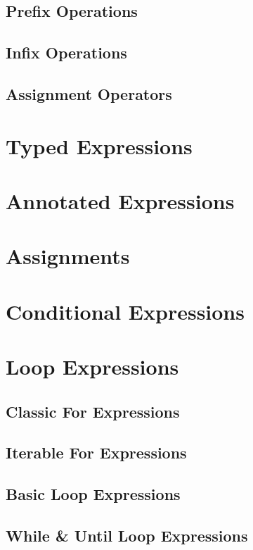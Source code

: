\subsection{Prefix Operations}

\subsection{Infix Operations}

\subsection{Assignment Operators}

\section{Typed Expressions}

\section{Annotated Expressions}

\section{Assignments}

\section{Conditional Expressions}

\section{Loop Expressions}

\subsection{Classic For Expressions}

\subsection{Iterable For Expressions}

\subsection{Basic Loop Expressions}

\subsection{While \& Until Loop Expressions}

